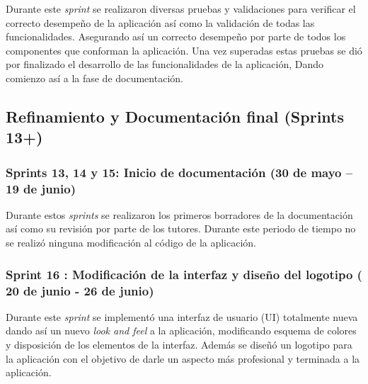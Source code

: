 Durante este \textit{sprint} se realizaron diversas pruebas y validaciones para verificar el correcto desempeño de la aplicación así como la validación de todas las funcionalidades. Asegurando así un correcto desempeño por parte de todos los componentes que conforman la aplicación.  Una vez superadas estas pruebas se dió por finalizado el desarrollo de las funcionalidades de la aplicación, Dando comienzo así a la fase de documentación.

\subsection{\textbf{Refinamiento y Documentación final (Sprints 13+)}}

\subsubsection{Sprints 13, 14 y 15: Inicio de documentación (30 de mayo – 19 de junio)}

Durante estos \textit{sprints} se realizaron los primeros borradores de la documentación así como su revisión por parte de los tutores. Durante este periodo de tiempo no se realizó ninguna modificación al código de la aplicación.

\subsubsection{Sprint 16 : Modificación de la interfaz y diseño del logotipo ( 20 de junio - 26 de junio)}

Durante este \textit{sprint} se implementó una interfaz de usuario (UI) totalmente nueva dando así un nuevo \textit{look and feel} a la aplicación, modificando esquema de colores y disposición de los elementos de la interfaz. Además se diseñó un logotipo para la aplicación con el objetivo de darle un aspecto más profesional y terminada a la aplicación.



